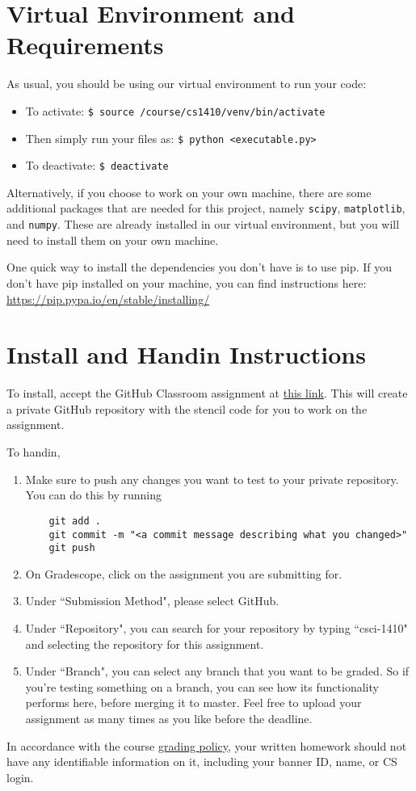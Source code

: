 \documentclass{article}
\begin{document}
\section{Virtual Environment and Requirements}
As usual, you should be using our virtual environment to run your code:
\begin{itemize}
\setlength\itemsep{0em}
\item To activate: \texttt{\$ source /course/cs1410/venv/bin/activate}
\item Then simply run your files as: \texttt{\$ python <executable.py>}
\item To deactivate: \texttt{\$ deactivate}
\end{itemize}

Alternatively, if you choose to work on your own machine, there are some additional packages that are needed for this project, namely \texttt{scipy}, \texttt{matplotlib}, and \texttt{numpy}. These are already installed in our virtual environment, but you will need to install them on your own machine.

One quick way to install the dependencies you don't have is to use pip. If you don't have pip installed on your machine, you can find instructions here: \url{https://pip.pypa.io/en/stable/installing/}

\section{Install and Handin Instructions}
To install, accept the GitHub Classroom assignment at \href{https://classroom.github.com/a/P7cmgUDq}{this link}. This will
create a private GitHub repository with the stencil code for you to work on the
assignment.

To handin,
\begin{enumerate}
  \item Make sure to push any changes you want to test to your private
    repository. You can do this by running
    \begin{verbatim}
    git add .
    git commit -m "<a commit message describing what you changed>"
    git push
    \end{verbatim}

  \item On Gradescope, click on the assignment you are submitting for.

  \item Under ``Submission Method", please select GitHub.

  \item Under ``Repository", you can search for your repository by typing ``csci-1410"
    and selecting the repository for this assignment.

  \item Under ``Branch", you can select any branch that you want to be graded. So if
    you're testing something on a branch, you can see how its functionality
    performs here, before merging it to master. Feel free to upload your assignment
    as many times as you like before the deadline.
\end{enumerate}

In accordance with the course \href {https://cs1410-website.vercel.app/files/Collaboration_Policy.pdf}{grading policy},
your written homework should not have any identifiable information on it,
including your banner ID, name, or CS login.
\end{document}
